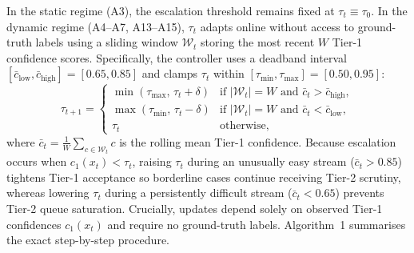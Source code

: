 \documentclass[diagnostics,article,submit,moreauthors]{Definitions/mdpi}
\newcommand{\rev}[1]{#1}
\begin{document}
In the static regime (A3), the escalation threshold remains fixed at $\tau_t \equiv \tau_0$. In the dynamic regime (A4--A7, A13--A15), $\tau_t$ adapts online without access to ground-truth labels using a sliding window $\mathcal{W}_t$ storing the most recent $W$ Tier-1 confidence scores. \rev{Specifically, the controller uses a deadband interval $[\bar{c}_{\text{low}}, \bar{c}_{\text{high}}] = [0.65, 0.85]$ and clamps $\tau_t$ within $[\tau_{\min}, \tau_{\max}] = [0.50, 0.95]$:}
\begin{equation}
\tau_{t+1} =
\begin{cases}
\min(\tau_{\max},\, \tau_t + \delta) & \text{if } |\mathcal{W}_t| = W \text{ and } \bar{c}_t > \bar{c}_{\text{high}}, \\
\max(\tau_{\min},\, \tau_t - \delta) & \text{if } |\mathcal{W}_t| = W \text{ and } \bar{c}_t < \bar{c}_{\text{low}}, \\
\tau_t & \text{otherwise,}
\end{cases}
\label{eq:dynamic_routing}
\end{equation}
\rev{where $\bar{c}_t = \frac{1}{W}\sum_{c \in \mathcal{W}_t} c$ is the rolling mean Tier-1 confidence. Because escalation occurs when $c_1(x_t) < \tau_t$, raising $\tau_t$ during an unusually easy stream ($\bar{c}_t > 0.85$) tightens Tier-1 acceptance so borderline cases continue receiving Tier-2 scrutiny, whereas lowering $\tau_t$ during a persistently difficult stream ($\bar{c}_t < 0.65$) prevents Tier-2 queue saturation. Crucially, updates depend solely on observed Tier-1 confidences $c_1(x_t)$ and require no ground-truth labels. Algorithm~1 summarises the exact step-by-step procedure.}
\end{document}
